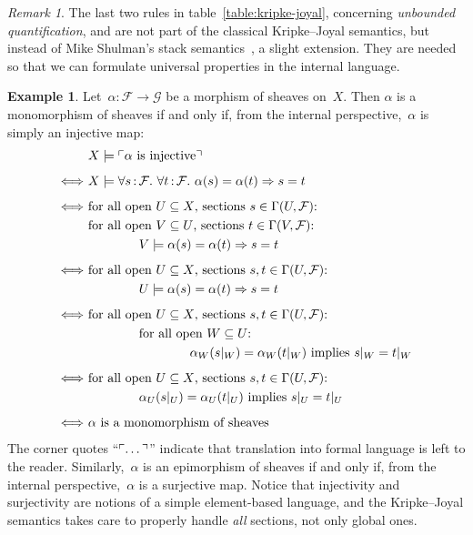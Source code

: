 \documentclass[10pt]{amsart}
\theoremstyle{definition}
\newtheorem{ex}[defn]{Example}
\theoremstyle{plain}
\theoremstyle{remark}
\newtheorem{rem}[defn]{Remark}
\newcommand{\F}{\mathcal{F}}
\newcommand{\G}{\mathcal{G}}
\newcommand{\?}{\,{:}\,}
\renewcommand{\_}{\mathpunct{.}\,}
\newcommand{\speak}[1]{\ulcorner\text{\textnormal{#1}}\urcorner}
\begin{document}
\begin{rem}The last two rules in table~\ref{table:kripke-joyal}, concerning
\emph{unbounded quantification}, and are not part of the classical Kripke--Joyal
semantics, but instead of Mike Shulman's stack semantics~\cite{shulman:stack},
a slight extension. They are needed so that we can formulate universal
properties in the internal language.
\end{rem}

\begin{ex}Let~$\alpha : \F \to \G$ be a morphism of sheaves on~$X$. Then
$\alpha$ is a monomorphism of sheaves if and only if, from the internal
perspective,~$\alpha$ is simply an injective map:
\allowdisplaybreaks
\begin{align*}
  & X \models \speak{$\alpha$ is injective} \\[0.5em]
  \Longleftrightarrow\
  & X \models \forall s\?\F\_ \forall t\?\F\_ \alpha(s) = \alpha(t) \Rightarrow s = t \\[0.5em]
  \Longleftrightarrow\ &
    \text{for all open~$U \subseteq X$, sections $s \in \Gamma(U, \F)$:} \\
  & \text{for all open~$V \subseteq U$, sections $t \in \Gamma(V, \F)$:} \\
  &\qquad\qquad
      V \models \alpha(s) = \alpha(t) \Rightarrow s = t \\[0.5em]
  \Longleftrightarrow\ &
    \text{for all open~$U \subseteq X$, sections $s, t \in \Gamma(U, \F)$:} \\
  &\qquad\qquad
      U \models \alpha(s) = \alpha(t) \Rightarrow s = t \\[0.5em]
  \Longleftrightarrow\ &
    \text{for all open~$U \subseteq X$, sections $s, t \in \Gamma(U, \F)$:} \\
  &\qquad\qquad
      \text{for all open~$W \subseteq U$:} \\
  &\qquad\qquad\qquad\qquad
        \text{$\alpha_W(s|_W) = \alpha_W(t|_W)$ implies $s|_W = t|_W$} \\[0.5em]
  \Longleftrightarrow\ &
    \text{for all open~$U \subseteq X$, sections $s, t \in \Gamma(U, \F)$:} \\
  &\qquad\qquad
        \text{$\alpha_U(s|_U) = \alpha_U(t|_U)$ implies $s|_U = t|_U$} \\[0.5em]
  \Longleftrightarrow\ &
    \text{$\alpha$ is a monomorphism of sheaves}
\end{align*}
The corner quotes ``$\speak{\ldots}$'' indicate that translation into formal
language is left to the reader. Similarly,~$\alpha$ is an epimorphism of
sheaves if and only if, from the internal perspective,~$\alpha$ is a
surjective map. Notice that injectivity and surjectivity are
notions of a simple element-based language, and the Kripke--Joyal semantics
takes care to properly handle \emph{all} sections, not only global ones.
\end{ex}
\end{document}
